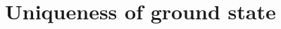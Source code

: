 \newcommand{\intrrr}{\int_{\R^3}}
\newcommand\todo[1]{{\green#1}}
\chapter{Uniqueness of ground state}





